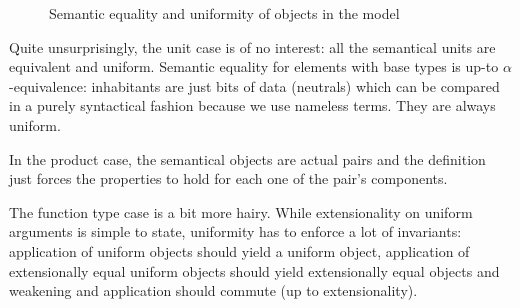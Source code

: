 \documentclass[preprint]{sigplanconf}
\begin{document}
\begin{definition}
\begin{figure}
\caption{Semantic equality and uniformity of objects in the model}
\label{logreleq}
\end{figure}

Quite unsurprisingly, the unit case is of no interest: all the semantical units
are equivalent and uniform. Semantic equality for elements with base types is
up-to $\alpha$-equivalence: inhabitants are just bits of data (neutrals) which
can be compared in a purely syntactical fashion because we use nameless terms.
They are always uniform.

In the product case, the semantical objects are actual pairs and the definition
just forces the properties to hold for each one of the pair's components.

The function type case is a bit more hairy. While extensionality on uniform arguments is
simple to state, uniformity has to enforce a lot of invariants: application of uniform
objects should yield a uniform object, application of extensionally equal uniform objects
should yield extensionally equal objects and weakening and application should commute (up
to extensionality).


\end{definition}
\end{document}
